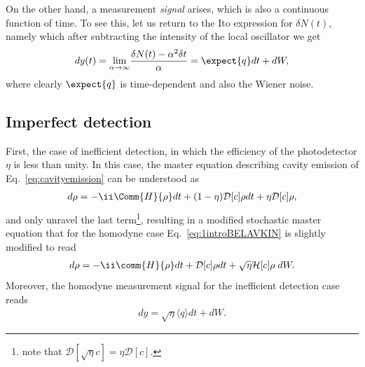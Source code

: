 On the other hand, a measurement \textit{signal} arises, which is also a continuous function of time. To see this, let us return to the Ito expression for $\delta N(t)$, namely
which after subtracting the intensity of the local oscillator we get
\begin{equation}
dy(t) = \underset{\alpha \rightarrow \infty}{\text{lim}} \frac{\delta N (t) - \alpha^2\delta t}{\alpha} = \expect{q}dt + dW,
\end{equation}
where clearly $\expect{q}$ is time-dependent and also the Wiener noise. \jcc{}

\subsection{Imperfect detection}
First, the case of inefficient detection, in which the efficiency of the photodetector $\eta$ is less than unity. In this case, the master equation describing cavity emission of Eq.~\ref{eq:cavityemission} can be understood as
\begin{align}
d\rho = -\ii \Comm{H}{\rho}dt + (1-\eta)\mathcal{D}[c] \rho dt + \eta \mathcal{D}[ c]\rho,
\end{align}
and only unravel the last term\footnote{note that $\mathcal{D}[\sqrt{\eta} c] = \eta \mathcal{D}[c]$.}, resulting in a modified stochastic master equation that for the homodyne case Eq.~\ref{eq:1introBELAVKIN} is slightly modified to read
\begin{align}\label{eq:inefficientDETECTION}
d\rho = -\ii\comm{H}{\rho}dt + \mathcal{D}[c] \rho dt + \sqrt{\eta} \mathcal{H}[c] \rho \;dW.
\end{align}
Moreover, the homodyne measurement signal for the inefficient detection case reads
\begin{align}\label{eq:1_cmon_ineff_measu}
dy = \sqrt{\eta} \langle q \rangle dt + dW.
\end{align}

